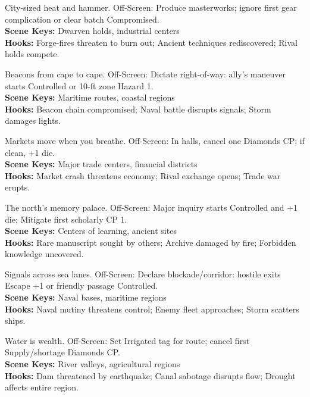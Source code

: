 \documentclass[12pt]{article}
\begin{document}
\begin{description}[leftmargin=*]
  \item[\textbf{Grand Forge--Citadel}] City-sized heat and hammer. Off-Screen: Produce masterworks; ignore first gear complication or clear batch Compromised. \\
  \textbf{Scene Keys:} Dwarven holds, industrial centers \\
  \textbf{Hooks:} Forge-fires threaten to burn out; Ancient techniques rediscovered; Rival holds compete.

  \item[\textbf{Harbor Light Consortium}] Beacons from cape to cape. Off-Screen: Dictate right-of-way: ally's maneuver starts Controlled or 10-ft zone Hazard 1. \\
  \textbf{Scene Keys:} Maritime routes, coastal regions \\
  \textbf{Hooks:} Beacon chain compromised; Naval battle disrupts signals; Storm damages lights.

  \item[\textbf{Grand Exchange Charter}] Markets move when you breathe. Off-Screen: In halls, cancel one Diamonds CP; if clean, +1 die. \\
  \textbf{Scene Keys:} Major trade centers, financial districts \\
  \textbf{Hooks:} Market crash threatens economy; Rival exchange opens; Trade war erupts.

  \item[\textbf{Thepyrgosi Great Library}] The north's memory palace. Off-Screen: Major inquiry starts Controlled and +1 die; Mitigate first scholarly CP 1. \\
  \textbf{Scene Keys:} Centers of learning, ancient sites \\
  \textbf{Hooks:} Rare manuscript sought by others; Archive damaged by fire; Forbidden knowledge uncovered.

  \item[\textbf{Kahfagian Fleet Command}] Signals across sea lanes. Off-Screen: Declare blockade/corridor: hostile exits Escape +1 or friendly passage Controlled. \\
  \textbf{Scene Keys:} Naval bases, maritime regions \\
  \textbf{Hooks:} Naval mutiny threatens control; Enemy fleet approaches; Storm scatters ships.

  \item[\textbf{Oshiiran Hydraulic Empire}] Water is wealth. Off-Screen: Set Irrigated tag for route; cancel first Supply/shortage Diamonds CP. \\
  \textbf{Scene Keys:} River valleys, agricultural regions \\
  \textbf{Hooks:} Dam threatened by earthquake; Canal sabotage disrupts flow; Drought affects entire region.


\end{description}
\end{document}
